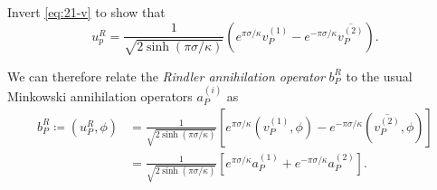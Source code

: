 \begin{exercise}
  Invert \eqref{eq:21-v} to show that
  \begin{equation}
    u_p^R = \frac{1}{\sqrt{2 \sinh (\pi \sigma / \kappa)}} \left( e^{\pi \sigma / \kappa} v_P^{(1)} - e^{- \pi \sigma / \kappa} \overline{v_P^{(2)}}{} \right).
  \end{equation}
\end{exercise}
We can therefore relate the \emph{Rindler annihilation operator} $b_P^R$ to the usual Minkowski annihilation operators $a_P^{(i)}$ as
\begin{align}
  b_P^R \coloneqq (u_P^R, \phi) &= \frac{1}{\sqrt{2 \sinh (\pi \sigma / \kappa)}} \left[ e^{\pi \sigma / \kappa} (v_P^{(1)}, \phi) - e^{- \pi \sigma / \kappa} (\overline{v_P^{(2)}}{}, \phi) \right] \\
				&= \frac{1}{\sqrt{2 \sinh(\pi \sigma / \kappa)}} \left[ e^{\pi \sigma / \kappa} a_P^{(1)} + e^{- \pi \sigma / \kappa} a_P^{(2)} \right].
\end{align}

